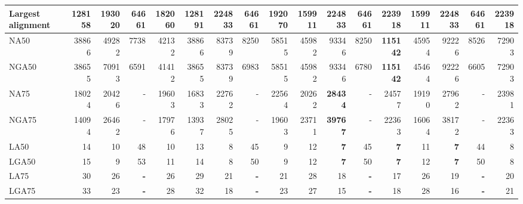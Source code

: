 \documentclass[12pt,a4paper]{article}
\begin{document}
\begin{table}[ht]
\begin{center}
\begin{tabular}{|l*{16}{|r}|}
Largest alignment & 128158 & 193020 & 64661 & 182060 & 128191 & {\bf 224833} & 64661 & 192070 & 159911 & {\bf 224833} & 64661 & 223918 & 159911 & {\bf 224833} & 64661 & 223918 \\ \hline
NA50 & 38866 & 49282 & 7738 & 42132 & 38866 & 83739 & 8250 & 58515 & 45982 & 93346 & 8250 & {\bf 115142} & 45954 & 92226 & 8526 & 72903 \\ \hline
NGA50 & 38655 & 70913 & 6591 & 41412 & 38655 & 83739 & 6983 & 58515 & 45982 & 93346 & 6780 & {\bf 115142} & 45464 & 92226 & 6605 & 72903 \\ \hline
NA75 & 18024 & 20426 & - & 19603 & 16833 & 22762 & - & 22564 & 20262 & {\bf 28434} & - & 24577 & 19190 & 27962 & - & 23981 \\ \hline
NGA75 & 14094 & 26462 & - & 17976 & 13937 & 28025 & - & 19603 & 23711 & {\bf 39767} & - & 22363 & 16064 & 38172 & - & 22363 \\ \hline
LA50 & 14 & 10 & 48 & 10 & 13 & 8 & 45 & 9 & 12 & {\bf 7} & 45 & {\bf 7} & 11 & {\bf 7} & 44 & 8 \\ \hline
LGA50 & 15 & 9 & 53 & 11 & 14 & 8 & 50 & 9 & 12 & {\bf 7} & 50 & {\bf 7} & 12 & {\bf 7} & 50 & 8 \\ \hline
LA75 & 30 & 26 & {\bf -} & 26 & 29 & 21 & {\bf -} & 21 & 28 & 18 & {\bf -} & 17 & 26 & 19 & {\bf -} & 20 \\ \hline
LGA75 & 33 & 23 & {\bf -} & 28 & 32 & 18 & {\bf -} & 23 & 27 & 15 & {\bf -} & 18 & 28 & 16 & {\bf -} & 21 \\ \hline
\end{tabular}
\end{center}
\end{table}
\end{document}
